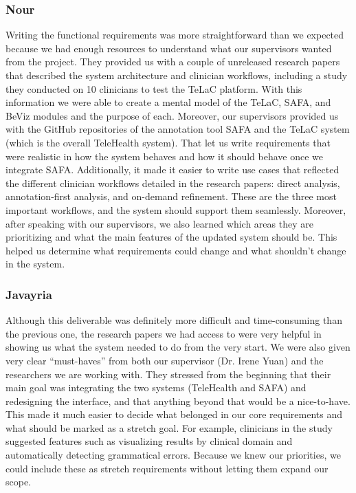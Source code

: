 \documentclass[12pt]{article}
\begin{document}
\subsubsection*{Nour}
Writing the functional requirements was more straightforward than we expected because we had enough resources to understand what our supervisors wanted from the project. 
They provided us with a couple of unreleased research papers that described the system architecture and clinician workflows, including a study they conducted on 10 clinicians to test the TeLaC platform. 
With this information we were able to create a mental model of the TeLaC, SAFA, and BeViz modules and the purpose of each. 
Moreover, our supervisors provided us with the GitHub repositories of the annotation tool SAFA and the TeLaC system (which is the overall TeleHealth system). 
That let us write requirements that were realistic in how the system behaves and how it should behave once we integrate SAFA. 
Additionally, it made it easier to write use cases that reflected the different clinician workflows detailed in the research papers: direct analysis, annotation-first analysis, and on-demand refinement. 
These are the three most important workflows, and the system should support them seamlessly. 
Moreover, after speaking with our supervisors, we also learned which areas they are prioritizing and what the main features of the updated system should be. 
This helped us determine what requirements could change and what shouldn’t change in the system.

\subsubsection*{Javayria}
Although this deliverable was definitely more difficult and time-consuming than the previous one, the research papers we had access to were very helpful in showing us what the system needed to do from the very start. We were also given very clear “must-haves” from both our supervisor (Dr. Irene Yuan) and the researchers we are working with. They stressed from the beginning that their main goal was integrating the two systems (TeleHealth and SAFA) and redesigning the interface, and that anything beyond that would be a nice-to-have. This made it much easier to decide what belonged in our core requirements and what should be marked as a stretch goal. For example, clinicians in the study suggested features such as visualizing results by clinical domain and automatically detecting grammatical errors. Because we knew our priorities, we could include these as stretch requirements without letting them expand our scope.
\end{document}
